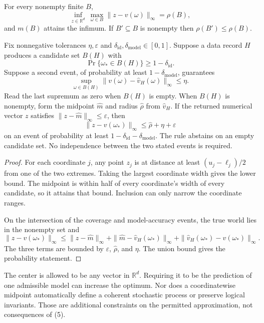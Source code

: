\begin{GAtheorem}\label{GA:thm:radius}
For every nonempty finite $B$,
\[
\inf_{z\in\mathbb R^d}\ \max_{\omega\in B}\|z-v(\omega)\|_\infty=\rho(B),
\]
and $m(B)$ attains the infimum. If $B'\subseteq B$ is nonempty then $\rho(B')\le\rho(B)$.

Fix nonnegative tolerances $\eta,\varepsilon$ and $\delta_{\mathrm{id}},\delta_{\mathrm{model}}\in[0,1]$. Suppose a data record $H$ produces a candidate set $B(H)$ with
\[
\Pr\{\omega_*\in B(H)\}\ge1-\delta_{\mathrm{id}}.
\]
Suppose a second event, of probability at least $1-\delta_{\mathrm{model}}$, guarantees
\[
\sup_{\omega\in B(H)}\|v(\omega)-\widehat v_H(\omega)\|_\infty\le\eta.
\]
Read the last supremum as zero when $B(H)$ is empty. When $B(H)$ is nonempty, form the midpoint $\widehat m$ and radius $\widehat\rho$ from $\widehat v_H$. If the returned numerical vector $z$ satisfies $\|z-\widehat m\|_\infty\le\varepsilon$, then
\[
\|z-v(\omega_*)\|_\infty\le\widehat\rho+\eta+\varepsilon\tag{6}
\]
on an event of probability at least $1-\delta_{\mathrm{id}}-\delta_{\mathrm{model}}$. The rule abstains on an empty candidate set. No independence between the two stated events is required.
\end{GAtheorem}
\begin{proof}
For each coordinate $j$, any point $z_j$ is at distance at least $(u_j-\ell_j)/2$ from one of the two extremes. Taking the largest coordinate width gives the lower bound. The midpoint is within half of every coordinate's width of every candidate, so it attains that bound. Inclusion can only narrow the coordinate ranges.

On the intersection of the coverage and model-accuracy events, the true world lies in the nonempty set and
\[
\|z-v(\omega_*)\|_\infty
\le\|z-\widehat m\|_\infty
+\|\widehat m-\widehat v_H(\omega_*)\|_\infty
+\|\widehat v_H(\omega_*)-v(\omega_*)\|_\infty.
\]
The three terms are bounded by $\varepsilon$, $\widehat\rho$, and $\eta$. The union bound gives the probability statement.
\end{proof}

The center is allowed to be any vector in $\mathbb R^d$. Requiring it to be the prediction of one admissible model can increase the optimum. Nor does a coordinatewise midpoint automatically define a coherent stochastic process or preserve logical invariants. Those are additional constraints on the permitted approximation, not consequences of (5).

